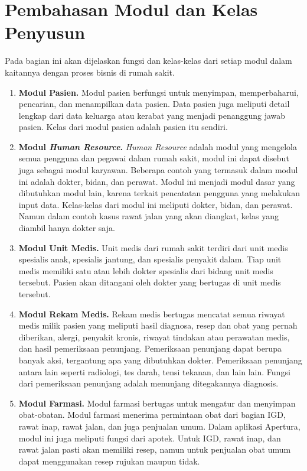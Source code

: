 \section{Pembahasan Modul dan Kelas Penyusun}
Pada bagian ini akan dijelaskan fungsi dan kelas-kelas dari setiap modul dalam kaitannya dengan proses bisnis di rumah sakit.

\begin{enumerate}[leftmargin=*]
	\item \textbf{Modul Pasien.} Modul pasien berfungsi untuk menyimpan, memperbaharui, pencarian, dan menampilkan data pasien. Data pasien juga meliputi detail lengkap dari data keluarga atau kerabat yang menjadi penanggung jawab pasien. Kelas dari modul pasien adalah pasien itu sendiri.
	\item \textbf{Modul \textit{Human Resource}.} \textit{Human Resource} adalah modul yang mengelola semua pengguna dan pegawai dalam rumah sakit, modul ini dapat disebut juga sebagai modul karyawan. Beberapa contoh yang termasuk dalam modul ini adalah dokter, bidan, dan perawat. Modul ini menjadi modul dasar yang dibutuhkan modul lain, karena terkait pencatatan pengguna yang melakukan input data. Kelas-kelas dari modul ini meliputi dokter, bidan, dan perawat. Namun dalam contoh kasus rawat jalan yang akan diangkat, kelas yang diambil hanya dokter saja.
	\item \textbf{Modul Unit Medis.} Unit medis dari rumah sakit terdiri dari unit medis spesialis anak, spesialis jantung, dan spesialis penyakit dalam. Tiap unit medis memiliki satu atau lebih dokter spesialis dari bidang unit medis tersebut. Pasien akan ditangani oleh dokter yang bertugas di unit medis tersebut.
	\item \textbf{Modul Rekam Medis.} Rekam medis bertugas mencatat semua riwayat medis milik pasien yang meliputi hasil diagnosa, resep dan obat yang pernah diberikan, alergi, penyakit kronis, riwayat tindakan atau perawatan medis, dan hasil pemeriksaan penunjang. Pemeriksaan penunjang dapat berupa banyak aksi, tergantung apa yang dibutuhkan dokter. Pemeriksaan penunjang antara lain seperti radiologi, tes darah, tensi tekanan, dan lain lain. Fungsi dari pemeriksaan penunjang adalah menunjang ditegakannya diagnosis.
	\item \textbf{Modul Farmasi.} Modul farmasi bertugas untuk mengatur dan menyimpan obat-obatan. Modul farmasi menerima permintaan obat dari bagian IGD, rawat inap, rawat jalan, dan juga penjualan umum. Dalam aplikasi Apertura, modul ini juga meliputi fungsi dari apotek. Untuk IGD, rawat inap, dan rawat jalan pasti akan memiliki resep, namun untuk penjualan obat umum dapat menggunakan resep rujukan maupun tidak.

\end{enumerate}
